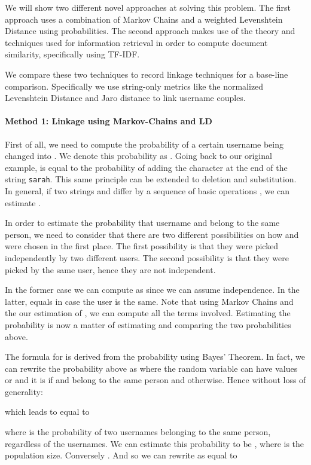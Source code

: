\documentclass[letterpaper]{sig-alternate}
\begin{document}
We will show two different novel approaches at solving this problem. The first approach
uses a combination of Markov Chains and a weighted Levenshtein Distance using probabilities.
The second approach makes use of the theory and techniques used for information retrieval
in order to compute document similarity, specifically using TF-IDF.

We compare these two techniques to record linkage techniques for a base-line comparison.
Specifically we use string-only metrics
like the normalized Levenshtein Distance and Jaro distance to link username couples.

\paragraph{Method 1: Linkage using Markov-Chains and LD}

First of all, we need to compute the probability of a certain
username  being changed into . We denote this probability as .
Going back to our original example,  is equal to the
probability of adding the character  at the end of the string
\texttt{sarah}. This same principle can be extended to deletion and
substitution.  In general, if two strings  and  differ by a sequence
of basic operations , we can estimate .

In order to estimate the probability that username  and  belong to
the same person, we need to consider that there are two different possibilities
on how  and  were chosen in the first place.  The first possibility is that they
were picked independently by two different users. The second possibility is
that they were picked by the same user, hence they are not independent.

In the former case we can compute  as   
since we can assume independence. In the latter,  equals 
in case the user is the same. Note that using Markov Chains and the our estimation of , 
we can compute all the terms involved.
Estimating the probability  is now a matter of estimating and
comparing the two probabilities above.



The formula for  is derived from the
probability  using Bayes' Theorem.
In fact, we can rewrite the probability above as  where the random
variable  can have values  or  and it is  if  and  belong to the same person
and  otherwise.
Hence without loss of generality:

which leads to  equal to

where  is the probability of two usernames belonging to the same
person, regardless of the usernames.  We can estimate this probability to be
, where  is the population size. Conversely .
And so we can rewrite  as  equal to
\end{document}

